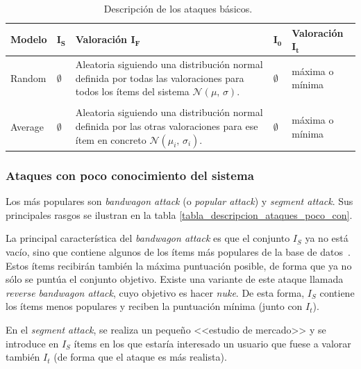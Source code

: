 \begin{table}
\small
\begin{centering}

		\begin{tabular}{@{}p{5em} p{2em} p{14em} p{2em} p{7em}@{}}
		\toprule
		\textbf{Modelo} & $\mathbf{I_S}$ & \textbf{Valoración} $\mathbf{I_F}$ & $\mathbf{I_0}$ & \textbf{Valoración} $\mathbf{I_t}$\\ 
		\midrule
	
		Random & $\emptyset$ & Aleatoria siguiendo una distribución normal definida por todas las valoraciones para todos los ítems del sistema $\mathcal{N}(\mu,\,\sigma)$. & $\emptyset$ & máxima o mínima \\\\
		
		Average & $\emptyset$ & Aleatoria siguiendo una distribución normal definida por las otras valoraciones para ese ítem en concreto $\mathcal{N}(\mu_i,\,\sigma_i)$. & $\emptyset$ & máxima o mínima\\
		\bottomrule
		\end{tabular}
	
\end{centering}
\caption{Descripción de los ataques básicos.~\cite{zhou2021SemisupervisedRecommendationAttack}}
\label{tabla_descripcion_ataques_basicos}	
\end{table}


\subsubsection{Ataques con poco conocimiento del sistema}

Los más populares son \textit{bandwagon attack} (o \textit{popular attack}) y \textit{segment attack}. Sus principales rasgos se ilustran en la tabla \ref{tabla_descripcion_ataques_poco_con}.

La principal característica del \textit{bandwagon attack} es que el conjunto $I_S$ ya no está vacío, sino que contiene algunos de los ítems más populares de la base de datos~\cite{zhou2021SemisupervisedRecommendationAttack}. Estos ítems recibirán también la máxima puntuación posible, de forma que ya no sólo se puntúa el conjunto objetivo. Existe una variante de este ataque llamada \textit{reverse bandwagon attack}, cuyo objetivo es hacer \textit{nuke}. De esta forma, $I_S$ contiene los ítems menos populares y reciben la puntuación mínima (junto con $I_t$).

En el \textit{segment attack}, se realiza un pequeño <<estudio de mercado>> y se introduce en $I_S$ ítems en los que estaría interesado un usuario que fuese a valorar también $I_t$ (de forma que el ataque es más realista).

